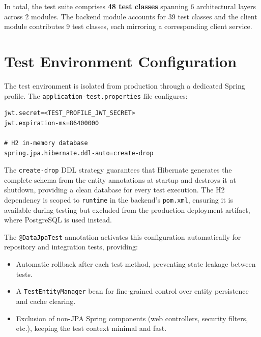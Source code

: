 In total, the test suite comprises \textbf{48 test classes} spanning 6 architectural layers across 2 modules. The backend module accounts for 39 test classes and the client module contributes 9 test classes, each mirroring a corresponding client service.

\section{Test Environment Configuration}

The test environment is isolated from production through a dedicated Spring profile. The \texttt{application-test.properties} file configures:

\begin{lstlisting}[caption=Test environment configuration]
jwt.secret=<TEST_PROFILE_JWT_SECRET>
jwt.expiration-ms=86400000

# H2 in-memory database
spring.jpa.hibernate.ddl-auto=create-drop
\end{lstlisting}

The \texttt{create-drop} DDL strategy guarantees that Hibernate generates the complete schema from the entity annotations at startup and destroys it at shutdown, providing a clean database for every test execution. The H2 dependency is scoped to \texttt{runtime} in the backend's \texttt{pom.xml}, ensuring it is available during testing but excluded from the production deployment artifact, where PostgreSQL is used instead.

The \texttt{@DataJpaTest} annotation activates this configuration automatically for repository and integration tests, providing:
\begin{itemize}
    \item Automatic rollback after each test method, preventing state leakage between tests.
    \item A \texttt{TestEntityManager} bean for fine-grained control over entity persistence and cache clearing.
    \item Exclusion of non-JPA Spring components (web controllers, security filters, etc.), keeping the test context minimal and fast.
\end{itemize}